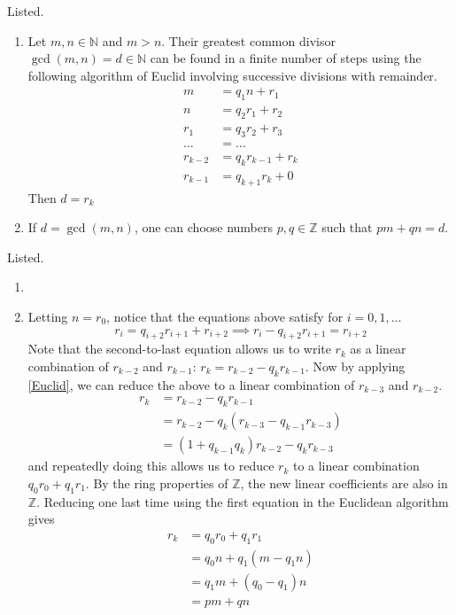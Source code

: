 \documentclass{article}
\begin{document}
    \begin{exercise}[Zorich 2.2.5]
    Listed. 
    \begin{enumerate}
        \item Let $m, n \in \mathbb{N}$ and $m >n$. Their greatest common divisor $\gcd(m, n) = d \in \mathbb{N}$ can be found in a finite number of steps using the following algorithm of Euclid involving successive divisions with remainder. 
        \begin{align*}
            m & = q_1 n + r_1 \\
            n & = q_2 r_1 + r_2 \\
            r_1 & = q_3 r_2 + r_3 \\
            \ldots & = \ldots \\
            r_{k-2} & = q_{k} r_{k-1} + r_{k} \\
            r_{k-1} & = q_{k+1} r_k + 0
        \end{align*}
        Then $d=r_k$ 
        \item If $d = \gcd(m, n)$, one can choose numbers $p, q \in \mathbb{Z}$ such that $pm + qn = d$. 
    \end{enumerate}
    \end{exercise}

    \begin{solution}
    Listed. 
    \begin{enumerate}
        \item 
        \item Letting $n = r_0$, notice that the equations above satisfy for $i=0, 1, \ldots$
        \[r_i = q_{i+2} r_{i+1} + r_{i+2} \implies r_{i} - q_{i+2} r_{i+1} = r_{i+2} \tag{1} \label{Euclid}\]
        Note that the second-to-last equation allows us to write $r_k$ as a linear combination of $r_{k-2}$ and $r_{k-1}$: $r_k = r_{k-2} - q_k r_{k-1}$. Now by applying \eqref{Euclid}, we can reduce the above to a linear combination of $r_{k-3}$ and $r_{k-2}$. 
        \begin{align*}
            r_k & = r_{k-2} - q_k r_{k-1} \\
            & = r_{k-2} - q_k (r_{k-3} - q_{k-1} r_{k-3}) \\
            & = (1 + q_{k-1} q_k) r_{k-2} - q_k r_{k-3} 
        \end{align*}
        and repeatedly doing this allows us to reduce $r_k$ to a linear combination $q_0 r_0 + q_1 r_1$. By the ring properties of $\mathbb{Z}$, the new linear coefficients are also in $\mathbb{Z}$. Reducing one last time using the first equation in the Euclidean algorithm gives 
        \begin{align*}
            r_k & = q_0 r_0 + q_1 r_1 \\
            & = q_0 n + q_1 (m - q_1 n) \\
            & = q_1 m + (q_0 - q_1) n \\
            & = p m + q n 
        \end{align*}
    \end{enumerate}
    \end{solution}
\end{document}
